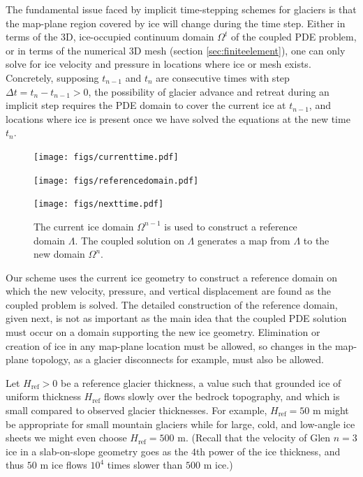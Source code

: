 \documentclass[letterpaper,final,12pt,reqno]{amsart}
\newcommand{\Href}{H_{\text{ref}}}
\begin{document}
The fundamental issue faced by implicit time-stepping schemes for glaciers is that the map-plane region covered by ice will change during the time step.  Either in terms of the 3D, ice-occupied continuum domain $\Omega^t$ of the coupled PDE problem, or in terms of the numerical 3D mesh (section \ref{sec:finiteelement}), one can only solve for ice velocity and pressure in locations where ice or mesh exists.  Concretely, supposing $t_{n-1}$ and $t_n$ are consecutive times with step $\Delta t = t_n - t_{n-1} > 0$, the possibility of glacier advance and retreat during an implicit step requires the PDE domain to cover the current ice at $t_{n-1}$, and locations where ice is present once we have solved the equations at the new time $t_n$.

\begin{figure}[ht]
\begin{center}
\texttt{[image: figs/currenttime.pdf]}
\vspace{-6mm}

\texttt{[image: figs/referencedomain.pdf]}
\vspace{-1mm}

\texttt{[image: figs/nexttime.pdf]}
\end{center}
\caption{The current ice domain $\Omega^{n-1}$ is used to construct a reference domain $\Lambda$.  The coupled solution on $\Lambda$ generates a map from $\Lambda$ to the new domain $\Omega^n$.}
\label{fig:domainupdate}
\end{figure}

Our scheme uses the current ice geometry to construct a reference domain on which the new velocity, pressure, and vertical displacement are found as the coupled problem is solved.  The detailed construction of the reference domain, given next, is not as important as the main idea that the coupled PDE solution must occur on a domain supporting the new ice geometry.  Elimination or creation of ice in any map-plane location must be allowed, so changes in the map-plane topology, as a glacier disconnects for example, must also be allowed.

Let $\Href>0$ be a reference glacier thickness, a value such that grounded ice of uniform thickness $\Href$ flows slowly over the bedrock topography, and which is small compared to observed glacier thicknesses.  For example, $\Href=50$ m might be appropriate for small mountain glaciers while for large, cold, and low-angle ice sheets we might even choose $\Href=500$ m.  (Recall that the velocity of Glen $n=3$ ice in a slab-on-slope geometry \cite{GreveBlatter2009} goes as the $4$th power of the ice thickness, and thus $50$ m ice flows $10^4$ times slower than $500$ m ice.)
\end{document}
